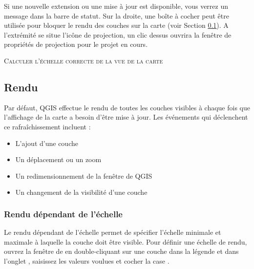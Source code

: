Si une nouvelle extension ou une mise à jour est disponible, vous verrez un message dans la barre de statut. Sur la droite, une boîte à cocher peut être utilisée pour bloquer le rendu des couches sur la carte (voir Section \ref{subsec:redraw_events}). A l'extrémité se situe l'icône de projection,  un clic dessus ouvrira la fenêtre de propriétés de projection pour le projet en cours.

\begin{Astuce}\caption{\textsc{Calculer l'échelle correcte de la vue de la carte}}
\end{Astuce}

\subsection{Rendu}\label{subsec:redraw_events}

Par défaut, QGIS effectue le rendu de toutes les couches visibles à chaque fois que l'affichage de la carte a besoin d'être mise à jour. Les événements qui déclenchent ce rafraîchissement incluent :

\begin{itemize}
\item L'ajout d'une couche
\item Un déplacement ou un zoom
\item Un redimensionnement de la fenêtre de QGIS
\item Un changement de la visibilité d'une couche
\end{itemize}

\subsubsection{Rendu dépendant de l'échelle}
\label{label_scaledepend}

Le rendu dépendant de l'échelle permet de spécifier l'échelle minimale et maximale à laquelle la couche doit être visible. Pour définir une échelle de rendu, ouvrez la fenêtre de  en double-cliquant sur une couche dans la légende et dans l'onglet , saisissez les valeurs voulues et cocher la case .

